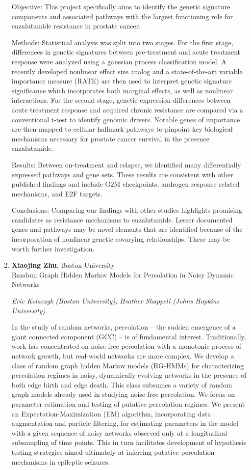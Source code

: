\begin{enumerate}
Objective: This project specifically aims to identify the genetic signature components and associated
pathways with the largest functioning role for enzalutamide resistance in prostate cancer.

Methods: Statistical analysis was split into two stages. For the first stage, differences in genetic
signatures between pre-treatment and acute treatment response were analyzed using a gaussian
process classification model. A recently developed nonlinear effect size analog and a state-of-the-art
variable importance measure (RATE) are then used to interpret genetic signature significance which
incorporates both marginal effects, as well as nonlinear interactions. For the second stage, genetic
expression differences between acute treatment response and acquired chronic resistance are compared via a conventional t-test to identify genomic drivers. Notable genes of importance are then mapped to cellular hallmark pathways to pinpoint key biological mechanisms necessary for prostate cancer survival in the presence enzalutamide.

Results: Between on-treatment and relapse, we identified many differentially expressed pathways and
gene sets. These results are consistent with other published findings and include G2M checkpoints,
androgen response related mechanisms, and E2F targets.

Conclusions: Comparing our findings with other studies highlights promising candidates as resistance
mechanisms to enzalutamide. Lesser documented genes and pathways may be novel elements that
are identified because of the incorporation of nonlinear genetic covarying relationships. These may
be worth further investigation.

\item \textbf{Xiaojing Zhu}, Boston University \\
Random Graph Hidden Markov Models for Percolation in Noisy Dynamic Networks

\emph{\footnotesize Eric Kolaczyk (Boston University); Heather Shappell (Johns Hopkins University)}

In the study of random networks, percolation – the sudden emergence of a giant connected component (GCC) – is of fundamental interest. Traditionally, work has concentrated on noise-free percolation with a monotonic process of network growth, but real-world networks are more complex. We develop a class of random graph hidden Markov models (RG-HMMs) for characterizing percolation regimes in noisy, dynamically evolving networks in the presence of both edge birth and edge death. This class subsumes a variety of random graph models already used in studying noise-free percolation. We focus on parameter estimation and testing of putative percolation regimes.  We present an Expectation-Maximization (EM) algorithm, incorporating data augmentation and particle filtering, for estimating parameters in the model with a given sequence of noisy networks observed only at a longitudinal subsampling of time points. This in turn facilitates development of hypothesis testing strategies aimed ultimately at inferring putative percolation mechanisms in epileptic seizures.

\end{enumerate}

